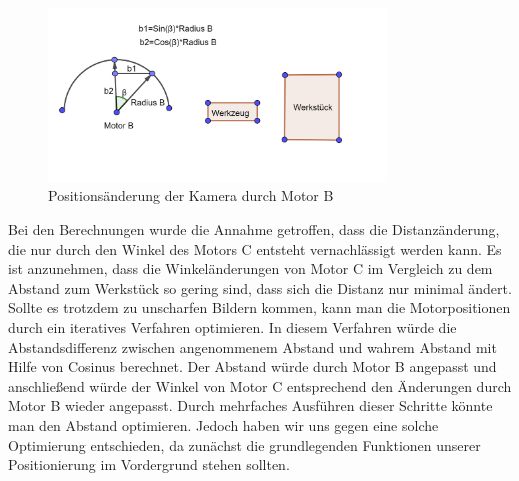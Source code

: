 \documentclass[12pt,a4paper,bibliography=totocnumbered,listof=totocnumbered]{scrartcl}
\begin{document}
\begin{figure}[htbp]
\centering 
\includegraphics[width=0.8\textwidth]{Motor_B.PNG}
\caption{Positionsänderung der Kamera durch Motor B}
\label{fig:B}
\end{figure}
\break
Bei den Berechnungen wurde die Annahme getroffen, dass die Distanzänderung, die nur durch den Winkel des Motors C entsteht vernachlässigt werden kann. Es ist anzunehmen, dass die Winkeländerungen von Motor C im Vergleich zu dem Abstand zum Werkstück so gering sind, dass sich die Distanz nur minimal ändert. Sollte es trotzdem zu unscharfen Bildern kommen, kann man die Motorpositionen durch ein iteratives Verfahren optimieren. In diesem Verfahren würde die Abstandsdifferenz zwischen angenommenem Abstand und wahrem Abstand mit Hilfe von Cosinus berechnet. Der Abstand würde durch Motor B angepasst und anschließend würde der Winkel von Motor C entsprechend den Änderungen durch Motor B wieder angepasst. Durch mehrfaches Ausführen dieser Schritte könnte man den Abstand optimieren. Jedoch haben wir uns gegen eine solche Optimierung entschieden, da zunächst die grundlegenden Funktionen unserer Positionierung im Vordergrund stehen sollten. 
\end{document}
